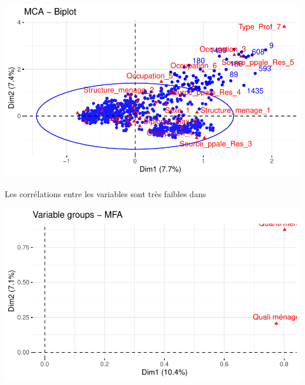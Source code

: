 \documentclass[11pt,a4paper, x11names]{article}\usepackage[]{graphicx}\usepackage[]{color}
\makeatletter
\def\maxwidth{ %
  \ifdim\Gin@nat@width>\linewidth
    \linewidth
  \else
    \Gin@nat@width
  \fi
}
\newenvironment{knitrout}{}{} %
\makeatother
\begin{document}
\begin{mdframed}[linecolor=blue]
\begin{knitrout}
\color{fgcolor}
\includegraphics[width=\maxwidth]{figure/unnamed-chunk-5-1} 
\end{knitrout}
\end{mdframed}

Les corrélations entre les variables sont très faibles dans 



\begin{mdframed}[linecolor=blue]
\begin{knitrout}
\color{fgcolor}
\includegraphics[width=\maxwidth]{figure/unnamed-chunk-8-1} 
\end{knitrout}
\end{mdframed}
\end{document}

